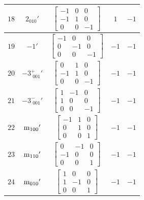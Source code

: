 \documentclass[fleqn,8pt]{jsarticle}
\begin{document}
\begin{longtable}{ccccc}
$ 18 $ & $ 2{}_{010}{}' $ & $ \begin{bmatrix} -1 & 0 & 0 \\ -1 & 1 & 0 \\ 0 & 0 & -1 \end{bmatrix} $ & $ 1 $ & $ -1 $ \\ \hline
$ 19 $ & $ -1{}' $ & $ \begin{bmatrix} -1 & 0 & 0 \\ 0 & -1 & 0 \\ 0 & 0 & -1 \end{bmatrix} $ & $ -1 $ & $ -1 $ \\ \hline
$ 20 $ & $ -3^{+}_{\,\,001}{}' $ & $ \begin{bmatrix} 0 & 1 & 0 \\ -1 & 1 & 0 \\ 0 & 0 & -1 \end{bmatrix} $ & $ -1 $ & $ -1 $ \\ \hline
$ 21 $ & $ -3^{-}_{\,\,001}{}' $ & $ \begin{bmatrix} 1 & -1 & 0 \\ 1 & 0 & 0 \\ 0 & 0 & -1 \end{bmatrix} $ & $ -1 $ & $ -1 $ \\ \hline
$ 22 $ & $ {\rm m}_{100}{}' $ & $ \begin{bmatrix} -1 & 1 & 0 \\ 0 & 1 & 0 \\ 0 & 0 & 1 \end{bmatrix} $ & $ -1 $ & $ -1 $ \\ \hline
$ 23 $ & $ {\rm m}_{110}{}' $ & $ \begin{bmatrix} 0 & -1 & 0 \\ -1 & 0 & 0 \\ 0 & 0 & 1 \end{bmatrix} $ & $ -1 $ & $ -1 $ \\ \hline
$ 24 $ & $ {\rm m}_{010}{}' $ & $ \begin{bmatrix} 1 & 0 & 0 \\ 1 & -1 & 0 \\ 0 & 0 & 1 \end{bmatrix} $ & $ -1 $ & $ -1 $ \\
\end{longtable}
\end{document}
